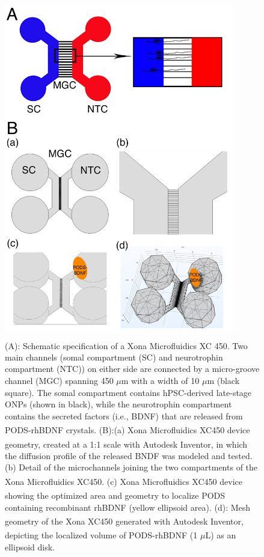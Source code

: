 \documentclass[review]{elsarticle}
\begin{document}
\begin{figure}
	\begin{center}
		\includegraphics[width=10cm]{Fig_3.jpg} %
	\end{center}
	\caption{(A): Schematic specification of a Xona\textsuperscript{\texttrademark} Microfluidics XC 450. Two main channels (somal compartment (SC) and neurotrophin compartment (NTC)) on either side are connected by a micro-groove channel (MGC) spanning 450 $\mu$m with a width of 10 $\mu$m (black square). The somal compartment contains hPSC-derived late-stage ONPs (shown in black), while the neurotrophin compartment contains the secreted factors (i.e., BDNF) that are released from PODS\textsuperscript{\textregistered}-rhBDNF crystals. (B):(a) Xona \textsuperscript{\texttrademark} Microfluidics XC450 device geometry, created at a 1:1 scale with Autodesk Inventor\textsuperscript{\textregistered}, in which the diffusion profile of the released BNDF was modeled and tested. (b) Detail of the microchannels joining the two compartments of the Xona \textsuperscript{\texttrademark} Microfluidics XC450. (c) Xona \textsuperscript{\texttrademark} Microfluidics XC450 device showing the optimized area and geometry to localize PODS\textsuperscript{\textregistered} containing recombinant rhBDNF (yellow ellipsoid area). (d): Mesh geometry of the Xona\textsuperscript{\texttrademark} XC450 generated with Autodesk Inventor, depicting the localized volume of PODS\textsuperscript{\textregistered}-rhBDNF (1 $\mu$L) as an ellipsoid disk.}
\end{figure}
\end{document}
